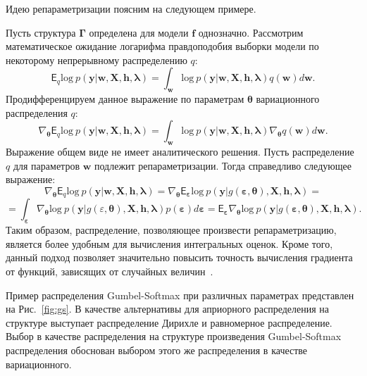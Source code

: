 Идею репараметризации поясним на следующем примере.
\begin{example} Пусть структура $\boldsymbol{\Gamma}$ определена для модели $\mathbf{f}$ однозначно. Рассмотрим математическое ожидание логарифма правдоподобия выборки модели по некоторому непрерывному распределению $q$:
\[
    \mathsf{E}_q \text{log}~p(\mathbf{y}|\mathbf{w}, \mathbf{X}, \mathbf{h}, \boldsymbol{\lambda})=  \int_{\mathbf{w}} \text{log}~p(\mathbf{y}|\mathbf{w}, \mathbf{X}, \mathbf{h}, \boldsymbol{\lambda})q(\mathbf{w})d\mathbf{w}.
\]
Продифференцируем данное выражение по параметрам $\boldsymbol{\theta}$ вариационного распределения $q$:
\[
    \nabla_{\boldsymbol{\theta}} \mathsf{E}_q \text{log}~p(\mathbf{y}|\mathbf{w}, \mathbf{X}, \mathbf{h}, \boldsymbol{\lambda}) = 
\int_{\mathbf{w}}  \text{log}~p(\mathbf{y}|\mathbf{w}, \mathbf{X}, \mathbf{h}, \boldsymbol{\lambda})\nabla_{\boldsymbol{\theta}}q(\mathbf{w})d\mathbf{w}.
\]
Выражение общем виде не имеет аналитического решения. Пусть распределение $q$ для параметров $\mathbf{w}$ подлежит репараметризации. Тогда справедливо следующее выражение:
\[
 \nabla_{\boldsymbol{\theta}} \mathsf{E}_q \text{log}~p(\mathbf{y}|\mathbf{w}, \mathbf{X}, \mathbf{h}, \boldsymbol{\lambda}) = \nabla_{\boldsymbol{\theta}} \mathsf{E}_{\boldsymbol{\varepsilon}} \text{log}~p(\mathbf{y}|g(\boldsymbol{\varepsilon}, \boldsymbol{\theta}), \mathbf{X}, \mathbf{h}, \boldsymbol{\lambda}) =
\]
\[= \int_{\boldsymbol{\varepsilon}}\nabla_{\boldsymbol{\theta}} \text{log}~p(\mathbf{y}|g(\varepsilon,\boldsymbol{\theta}), \mathbf{X}, \mathbf{h},\boldsymbol{\lambda}) p(\boldsymbol{\varepsilon}) d\boldsymbol{\varepsilon}=\mathsf{E}_{\boldsymbol{\varepsilon}} \nabla_{\boldsymbol{\theta}} \text{log}~p(\mathbf{y}|g(\boldsymbol{\varepsilon}, \boldsymbol{\theta}), \mathbf{X}, \mathbf{h}, \boldsymbol{\lambda}).\]
Таким образом, распределение, позволяющее произвести репараметризацию, является более удобным для вычисления интегральных оценок.
Кроме того, данный подход позволяет значительно повысить точность вычисления градиента от функций, зависящих от случайных величин~\cite{reparametrization}.
\end{example}

Пример распределения Gumbel-Softmax при различных параметрах представлен на Рис.~\ref{fig:gs}. В качестве альтернативы для априорного распределения на структуре выступает  распределение Дирихле и равномерное распределение. Выбор в качестве распределения на структуре произведения Gumbel-Softmax распределения обоснован выбором этого же распределения в качестве вариационного. 

